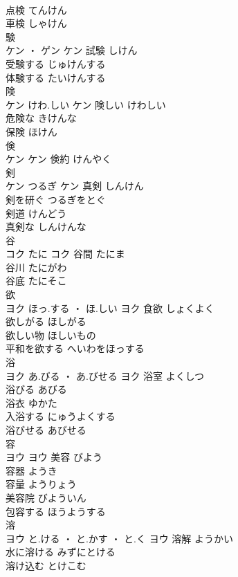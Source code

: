 \documentclass[8pt]{extreport}
\begin{document}
\begin{CJK}{UTF8}{min}
\\	点検	てんけん	
\\	車検	しゃけん	
\\	験	
\\	ケン ・ ゲン		ケン	試験	しけん	
\\	受験する	じゅけんする	
\\	体験する	たいけんする	
\\	険	
\\	ケン	けわ.しい	ケン	険しい	けわしい	
\\	危険な	きけんな	
\\	保険	ほけん	
\\	倹	
\\	ケン		ケン													倹約	けんやく	
\\	剣	
\\	ケン	つるぎ	ケン	真剣	しんけん	
\\	剣を研ぐ	つるぎをとぐ	
\\	剣道	けんどう	
\\	真剣な	しんけんな	
\\	谷	
\\	コク	たに	コク	谷間	たにま	
\\	谷川	たにがわ	
\\	谷底	たにそこ	
\\	欲	
\\	ヨク	ほっ.する ・ ほ.しい	ヨク	食欲	しょくよく	
\\	欲しがる	ほしがる	
\\	欲しい物	ほしいもの	
\\	平和を欲する	へいわをほっする	
\\	浴	
\\	ヨク	あ.びる ・ あ.びせる	ヨク	浴室	よくしつ	
\\	浴びる	あびる	
\\	浴衣	ゆかた	
\\	入浴する	にゅうよくする	
\\	浴びせる	あびせる	
\\	容	
\\	ヨウ		ヨウ	美容	びよう	
\\	容器	ようき	
\\	容量	ようりょう	
\\	美容院	びよういん	
\\	包容する	ほうようする	
\\	溶	
\\	ヨウ	と.ける ・ と.かす ・ と.く	ヨウ	溶解	ようかい	
\\	水に溶ける	みずにとける	
\\	溶け込む	とけこむ	

\end{CJK}
\end{document}
